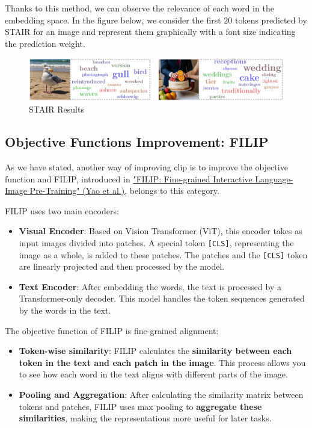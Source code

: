 Thanks to this method, we can observe the relevance of each word in the embedding space. In the figure below, we consider the first 20 tokens predicted by STAIR for an image and represent them graphically with a font size indicating the prediction weight.

\begin{figure}[!htbp]
    \centering
    \includegraphics[width=\linewidth]{tikz/chapter11 - STAIR Results.pdf}
    \caption{STAIR Results}
\end{figure}



\subsection{Objective Functions Improvement: FILIP}

As we have stated, another way of improving clip is to improve the objective function and FILIP, introduced in \href{https://arxiv.org/pdf/2111.07783}{"FILIP: Fine-grained Interactive Language-Image Pre-Training" (Yao et al.)}, belongs to this category. 

FILIP uses two main encoders:
\begin{itemize}
    \item \textbf{Visual Encoder}: Based on Vision Transformer (ViT), this encoder takes as input images divided into patches. A special token \texttt{[CLS]}, representing the image as a whole, is added to these patches. The patches and the \texttt{[CLS]} token are linearly projected and then processed by the model.
    \item \textbf{Text Encoder}: After embedding the words, the text is processed by a Transformer-only decoder. This model handles the token sequences generated by the words in the text.
\end{itemize}


The objective function of FILIP is fine-grained alignment:
\begin{itemize}
    \item \textbf{Token-wise similarity}: FILIP calculates the \textbf{similarity between each token in the text and each patch in the image}. This process allows you to see how each word in the text aligns with different parts of the image.
    \item \textbf{Pooling and Aggregation}: After calculating the similarity matrix between tokens and patches, FILIP uses max pooling to \textbf{aggregate these similarities}, making the representations more useful for later tasks.
\end{itemize}

